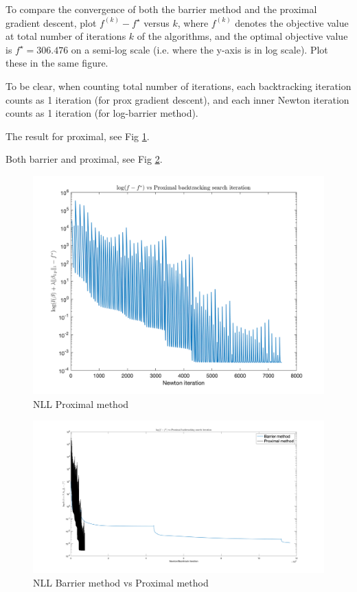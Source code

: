 \documentclass{article}
\theoremstyle{remark}
\theoremstyle{definition}
\begin{document}
\begin{enumerate}[(a)]
\begin{enumerate}
	    To compare the convergence of both the barrier method and the proximal gradient descent, plot $f^{(k)} - f^{\star}$ versus $k$,  where $f^{(k)}$ denotes the objective value at total number of iterations $k$ of the algorithms, and the optimal objective value is $f^\star = 306.476$ on a semi-log scale (i.e. where the y-axis is in log scale). Plot these in the same figure. 

      To be clear, when counting total number of iterations, each backtracking iteration counts as 1 iteration (for prox gradient descent), and each inner Newton iteration counts as 1 iteration (for log-barrier method).
      {
      \color{blue}
      
      The result for proximal, see Fig \ref{fig:nll_proximal}.
      
      Both barrier and proximal, see Fig \ref{fig:barrier-prox}.
        \begin{figure}
            \centering
            \includegraphics[scale=.3]{prox.png}
            \caption{NLL Proximal method}
            \label{fig:nll_proximal}
        \end{figure}
        
        \begin{figure}
            \centering
            \includegraphics[scale=.15]{barrier-prox.png}
            \caption{NLL Barrier method vs Proximal method}
            \label{fig:barrier-prox}
        \end{figure}
      }
	    \end{enumerate}
\end{enumerate}
\end{document}

